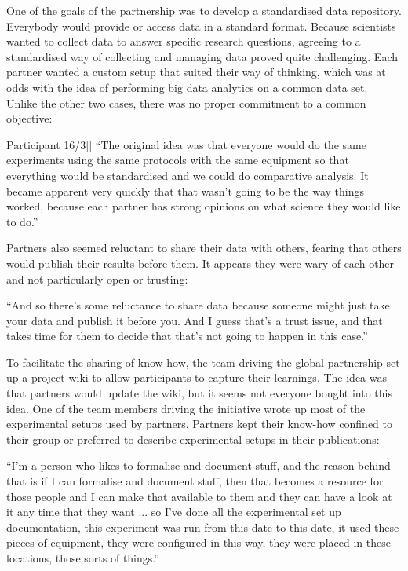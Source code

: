 One of the goals of the partnership was to develop a standardised data repository. Everybody would provide or access data in a standard format. Because scientists wanted to collect data to answer specific research questions, agreeing to a standardised way of collecting and managing data proved quite challenging. Each partner wanted a custom setup that suited their way of thinking, which was at odds with the idea of performing big data analytics on a common data set. Unlike the other two cases, there was no proper commitment to a common objective:

\begin{displayquote}Participant 16/3[]
\small
\enquote{The original idea was that everyone would do the same experiments using the same protocols with the same equipment so that everything would be standardised and we could do comparative analysis. It became apparent very quickly that that wasn't going to be the way things worked, because each partner has strong opinions on what science they would like to do.} 
\end{displayquote}

Partners also seemed reluctant to share their data with others, fearing that others would publish their results before them. It appears they were wary of each other and not particularly open or trusting:

\begin{displayquote}[Participant 16/3]
\small
\enquote{And so there's some reluctance to share data because someone might just take your data and publish it before you. And I guess that's a trust issue, and that takes time for them to decide that that's not going to happen in this case.} 
\end{displayquote}

To facilitate the sharing of know-how, the team driving the global partnership set up a project wiki to allow participants to capture their learnings. The idea was that partners would update the wiki, but it seems not everyone bought into this idea. One of the team members driving the initiative wrote up most of the experimental setups used by partners. Partners kept their know-how confined to their group or preferred to describe experimental setups in their publications:

\begin{displayquote}[Participant 16/3]
\small
\enquote{I'm a person who likes to formalise and document stuff, and the reason behind that is if I can formalise and document stuff, then that becomes a resource for those people and I can make that available to them and they can have a look at it any time that they want ... so I've done all the experimental set up documentation, this experiment was run from this date to this date, it used these pieces of equipment, they were configured in this way, they were placed in these locations, those sorts of things.} 
\end{displayquote}

